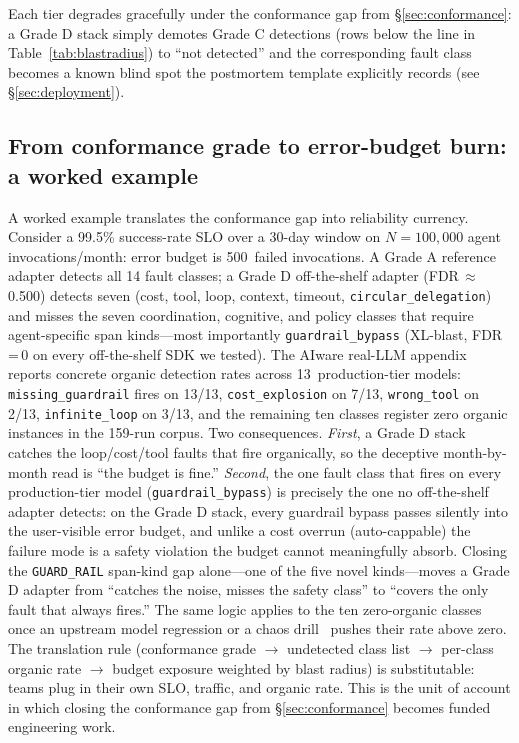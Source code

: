 \documentclass[conference]{IEEEtran}
\begin{document}
Each tier degrades gracefully under the conformance gap from
\S\ref{sec:conformance}: a Grade D stack simply demotes Grade C
detections (rows below the line in Table~\ref{tab:blastradius}) to
``not detected'' and the corresponding fault class becomes a known
blind spot the postmortem template explicitly records (see
\S\ref{sec:deployment}).

\subsection{From conformance grade to error-budget burn: a worked example}
\label{sec:slo}

A worked example translates the conformance gap into reliability
currency. Consider a 99.5\% success-rate SLO over a 30-day window
on $N=100{,}000$ agent invocations/month: error budget is
500~failed invocations. A Grade A reference adapter detects all 14
fault classes; a Grade D off-the-shelf adapter (FDR\,$\approx$\,0.500)
detects seven (cost, tool, loop, context, timeout,
\texttt{circular\_delegation}) and misses the seven coordination,
cognitive, and policy classes that require agent-specific span
kinds---most importantly \texttt{guardrail\_bypass} (XL-blast,
FDR\,=\,0 on every off-the-shelf SDK we tested). The AIware
real-LLM appendix~\cite{agenttelemetry_aiware} reports concrete
organic detection rates across 13~production-tier models:
\texttt{missing\_guardrail} fires on 13/13, \texttt{cost\_explosion}
on 7/13, \texttt{wrong\_tool} on 2/13, \texttt{infinite\_loop} on
3/13, and the remaining ten classes register zero organic instances
in the 159-run corpus. Two consequences. \emph{First}, a Grade D
stack catches the loop/cost/tool faults that fire organically, so
the deceptive month-by-month read is ``the budget is fine.''
\emph{Second}, the one fault class that fires on every
production-tier model (\texttt{guardrail\_bypass}) is precisely the
one no off-the-shelf adapter detects: on the Grade D stack, every
guardrail bypass passes silently into the user-visible error budget,
and unlike a cost overrun (auto-cappable) the failure mode is a
safety violation the budget cannot meaningfully absorb. Closing the
\texttt{GUARD\_RAIL} span-kind gap alone---one of the five novel
kinds---moves a Grade D adapter from ``catches the noise, misses
the safety class'' to ``covers the only fault that always fires.''
The same logic applies to the ten zero-organic classes once an
upstream model regression or a chaos drill~\cite{netflix_chaos}
pushes their rate above zero.
The translation rule (conformance grade $\to$ undetected class list
$\to$ per-class organic rate $\to$ budget exposure weighted by
blast radius) is substitutable: teams plug in their own SLO,
traffic, and organic rate. This is the unit of account in which
closing the conformance gap from \S\ref{sec:conformance} becomes
funded engineering work.
\end{document}

